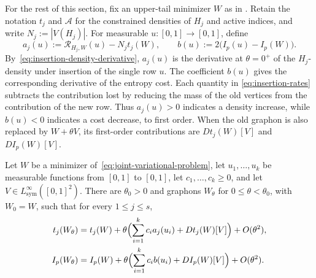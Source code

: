 For the rest of this section, fix an upper-tail minimizer $W$ as in
.
Retain the notation $t_j$ and $\mathcal A$ for the constrained densities of $H_j$
and active indices, and write $N_j:=|V(H_j)|$.
For measurable $u:[0,1]\to[0,1]$, define
\begin{equation}\label{eq:insertion-rates}
  a_j(u):=\mathcal R_{H_j,W}(u)-N_jt_j(W),\qquad b(u):=2\bigl(I_p(u)-I_p(W)\bigr).
\end{equation}
By~\eqref{eq:insertion-density-derivative}, $a_j(u)$ is the derivative
at $\theta=0^+$ of the $H_j$-density under insertion of the single row $u$.
The coefficient $b(u)$ gives the corresponding derivative of the entropy cost.
Each quantity in \eqref{eq:insertion-rates}
subtracts the contribution lost by reducing the mass of the old
vertices from the contribution of the new row.  Thus $a_j(u)>0$ indicates
a density increase, while $b(u)<0$ indicates a cost decrease, to first order.
When the old graphon is also replaced by $W+\theta V$, its first-order
contributions are $Dt_j(W)[V]$ and $DI_p(W)[V]$.

\begin{lemma}\label{lem:insertion-first-order}
Let $W$ be a minimizer of~\eqref{eq:joint-variational-problem}, let $u_1,\dots,u_k$ be
measurable functions from $[0,1]$ to $[0,1]$, let $c_1,\dots,c_k\ge0$, and let
$V\in L^\infty_{\mathrm{sym}}([0,1]^2)$.  There are $\theta_0>0$ and graphons $W_\theta$
for $0\le\theta<\theta_0$, with $W_0=W$, such that for every $1\le j\le s$,
\begin{align*}
  t_j(W_\theta)&=t_j(W)
  +\theta\Bigl(\sum_{i=1}^kc_ia_j(u_i)+Dt_j(W)[V]\Bigr)+O(\theta^2), \\
  I_p(W_\theta)&=I_p(W)
  +\theta\Bigl(\sum_{i=1}^kc_ib(u_i)+DI_p(W)[V]\Bigr)+O(\theta^2).
\end{align*}
\end{lemma}

